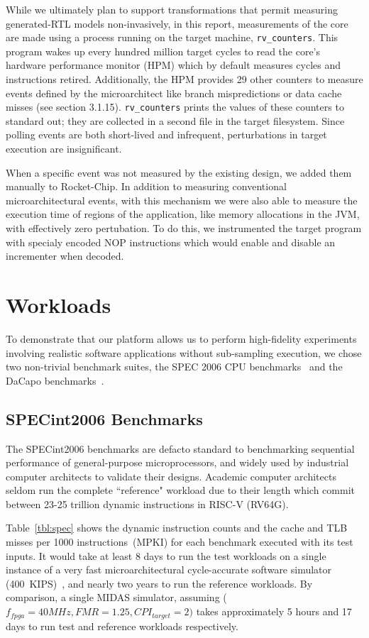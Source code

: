 While we ultimately plan to support transformations that permit
measuring generated-RTL models non-invasively, in this report,
measurements of the core are made using a process running on the target machine,
\texttt{rv\_counters}. This program wakes up every hundred million target
cycles to read the core's hardware performance monitor (HPM) which by default measures
cycles and instructions retired. Additionally, the HPM provides 29 other counters to measure
events defined by the microarchitect like branch mispredictions or data
cache misses (see \cite{Waterman:EECS-2016-161} section 3.1.15).
\texttt{rv\_counters} prints the values of these counters to standard out; they are collected
in a second file in the target filesystem. Since polling events are both
short-lived and infrequent, perturbations in target execution are insignificant.

When a specific event was not measured by the existing design, we added them
manually to Rocket-Chip. In addition to measuring conventional
microarchitectural events, with this mechanism we were also able to measure the
execution time of regions of the application, like memory allocations in the
JVM, with effectively zero pertubation. To do this, we instrumented the target
program with specialy encoded NOP instructions which would enable and disable
an incrementer when decoded.

\section{Workloads}

To demonstrate that our platform allows us to perform high-fidelity experiments
involving realistic software applications without sub-sampling execution, we
chose two non-trivial benchmark suites, the SPEC 2006 CPU
benchmarks~\cite{spec_cpu_2006} and the DaCapo benchmarks~\cite{dacapo}.

\subsection{SPECint2006 Benchmarks} The SPECint2006 benchmarks are defacto
standard to benchmarking sequential performance of general-purpose
microprocessors, and widely used by industrial computer architects to validate
their designs. Academic computer architects seldom run the complete
``reference" workload due to their length which commit between 23-25 trillion
dynamic instructions in RISC-V (RV64G).

Table~\ref{tbl:spec} shows the dynamic instruction counts and the cache and TLB
misses per 1000 instructions~(MPKI) for each benchmark executed with its test
inputs. It would take at least 8 days to run the test workloads on a single
instance of a very fast microarchitectural cycle-accurate software simulator
(400~KIPS)~\cite{marssx86}, and nearly two years to run the reference
workloads. By comparison, a single MIDAS simulator, assuming ($f_{fpga} = 40
MHz, FMR = 1.25, CPI_{target} = 2)$ takes approximately 5 hours and 17 days to
run test and reference workloads respectively.

